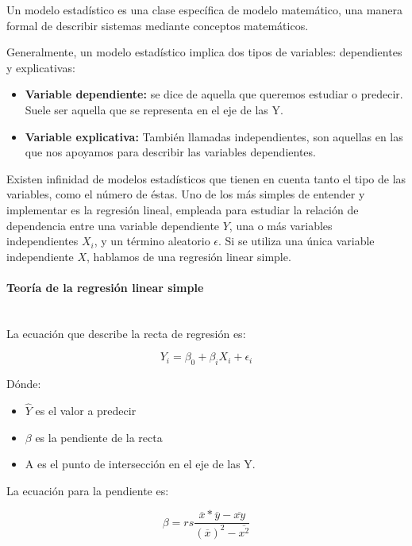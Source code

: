 Un modelo estadístico es una clase específica de modelo matemático, una
manera formal de describir sistemas mediante conceptos matemáticos.

Generalmente, un modelo estadístico implica dos tipos de variables: dependientes
y explicativas:

\begin{itemize}
\item \textbf{Variable dependiente: } se dice de aquella que queremos estudiar o
  predecir. Suele ser aquella que se representa en el eje de las Y.

\item \textbf{Variable explicativa: } También llamadas independientes, son aquellas en las que nos apoyamos para
  describir las variables dependientes.
\end{itemize}

Existen infinidad de modelos estadísticos que tienen en cuenta tanto el tipo de
las variables, como el número de éstas. Uno de los más simples de entender y
implementar es la regresión lineal, empleada para estudiar la relación de
dependencia entre una variable dependiente $Y$, una o más variables
independientes $X_i$, y un término aleatorio $\epsilon$. Si se utiliza una única
variable independiente $X$, hablamos de una regresión linear simple.


\paragraph{Teoría de la regresión linear simple}\mbox{}\\

La ecuación que describe la recta de regresión es: 

\begin{equation}
  Y_i = \beta_0 + \beta_i X_i + \epsilon_i
\end{equation}

Dónde:

\begin{itemize}
\item $\hat{Y}$ es el valor a predecir
\item $\beta$ es la pendiente de la recta
\item A es el punto de intersección en el eje de las Y.
\end{itemize}

La ecuación para la pendiente es:

\begin{equation}
  \beta = r s \frac{\overline{x} * \overline{y} - \overline{xy}}{(\overline{x})^2 - \overline{x^2}}
\end{equation}


